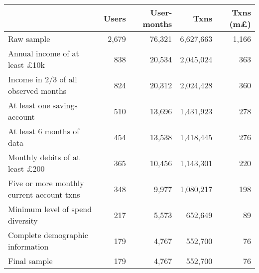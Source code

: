 \begin{tabular}{lrrrr}
\toprule
                                          & Users & User-months &      Txns & Txns (m\pounds) \\
\midrule
                               Raw sample & 2,679 &      76,321 & 6,627,663 &           1,166 \\
     Annual income of at least \pounds10k &   838 &      20,534 & 2,045,024 &             363 \\
     Income in 2/3 of all observed months &   824 &      20,312 & 2,024,428 &             360 \\
             At least one savings account &   510 &      13,696 & 1,431,923 &             278 \\
                At least 6 months of data &   454 &      13,538 & 1,418,445 &             276 \\
    Monthly debits of at least \pounds200 &   365 &      10,456 & 1,143,301 &             220 \\
Five or more monthly current account txns &   348 &       9,977 & 1,080,217 &             198 \\
         Minimum level of spend diversity &   217 &       5,573 &   652,649 &              89 \\
         Complete demographic information &   179 &       4,767 &   552,700 &              76 \\
                             Final sample &   179 &       4,767 &   552,700 &              76 \\
\bottomrule
\end{tabular}
